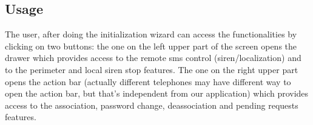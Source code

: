 \subsection{Usage}
\small{The user, after doing the initialization wizard can access the functionalities by clicking on two buttons: the one on the left upper part of the screen opens the drawer which provides access to the remote sms control (siren/localization) and to the perimeter and local siren stop features. The one on the right upper part opens the action bar (actually different telephones may have different way to open the action bar, but that's independent from our application) which provides access to the association, password change, deassociation and pending requests features.}